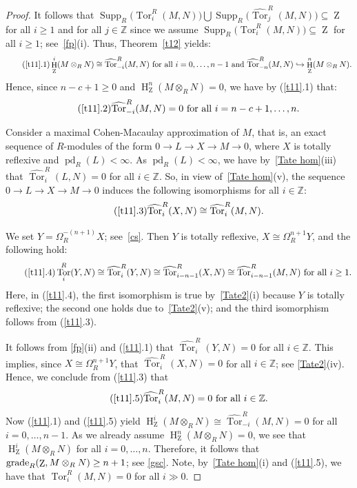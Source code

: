 \documentclass[11pt]{amsart}
\theoremstyle{definition}
\theoremstyle{definition}
\numberwithin{equation}{section}
\newcommand{\ZZ}{\mathbb{Z}}
\DeclareMathOperator{\gr}{\textnormal{grade}}
\DeclareMathOperator{\mz}{Z}
\DeclareMathOperator{\hh}{H}
\DeclareMathOperator{\pd}{pd}
\DeclareMathOperator{\Supp}{Supp}
\DeclareMathOperator{\Tor}{Tor}
\begin{document}
\begin{proof} It follows that $\Supp_R\big(\Tor_i^R(M,N)\big) \bigcup \Supp_R\Big(\widehat{\Tor}_j^R(M,N)\Big) \subseteq\mz$ for all $i\geq 1$ and for all $j\in\ZZ$ since we assume $\Supp_R\big(\Tor_{i}^R(M,N)\big)\subseteq\mz$ for all $i\geq 1$; see~\ref{fp}(i). Thus, Theorem~\ref{t12} yields:
\begin{equation}\tag{\ref{t11}.1}
\hh^i_{\mz}(M\otimes_RN)\cong\widehat{\Tor}_{-i}^R(M,N) \text{ for all } i=0, \ldots, n-1 \text{ and } \widehat{\Tor}_{-n}^R(M,N)\hookrightarrow\hh^n_{\mz}(M\otimes_RN).
\end{equation}
Hence, since $n-c+1 \geq 0$ and $\hh^n_{\mz}(M\otimes_RN)=0$, we have by (\ref{t11}.1) that:
\begin{equation}\tag{\ref{t11}.2}
\widehat{\Tor}_{-i}^R(M,N)=0 \text{ for all } i=n-c+1, \ldots, n.
\end{equation}

Consider a maximal Cohen-Macaulay approximation of $M$, that is, an exact sequence of $R$-modules of the form $0\to L\to X\to M\to0$, where $X$ is totally reflexive and $\pd_R(L)<\infty$. As $\pd_R(L)<\infty$, we have by~\ref{Tate hom}(iii) that $\widehat{\Tor}_i^R(L,N)=0$ for all $i\in\ZZ$. So, in view of~\ref{Tate hom}(v), the sequence $0\to L\to X\to M \to 0$ induces the following isomorphisms for all $i \in \ZZ$:
\begin{equation}\tag{\ref{t11}.3}
\widehat{\Tor}_i^R(X,N) \cong \widehat{\Tor}_i^R(M,N).
\end{equation}

We set $Y=\Omega_R^{-(n+1)}X$; see~\ref{cs}. Then $Y$ is totally reflexive, $X \cong \Omega_R^{n+1}Y$, and the following hold:
\begin{equation}\tag{\ref{t11}.4}
\Tor_i^R(Y,N)\cong\widehat{\Tor}_i^R(Y,N)\cong\widehat{\Tor}_{i-n-1}^R(X,N)\cong\widehat{\Tor}_{i-n-1}^R(M,N) \text{ for all } i\geq 1.
\end{equation}
Here, in (\ref{t11}.4), the first isomorphism is true by~\ref{Tate2}(i) because $Y$ is totally reflexive; the second one holds due to~\ref{Tate2}(v); and the third isomorphism follows from (\ref{t11}.3).

It follows from \ref{fp}(ii) and (\ref{t11}.1) that $\widehat{\Tor}_i^R(Y,N)=0$ for all $i\in\ZZ$. This implies, since $X \cong \Omega_R^{n+1}Y$, that $\widehat{\Tor}_i^R(X,N)=0$ for all $i\in\ZZ$; see \ref{Tate2}(iv). Hence, we conclude from (\ref{t11}.3) that 
\begin{equation}\tag{\ref{t11}.5}
\widehat{\Tor}_i^R(M,N)=0 \text{ for all } i\in \ZZ.
\end{equation}
Now (\ref{t11}.1)  and (\ref{t11}.5) yield $\hh^i_{\mz}(M\otimes_RN)\cong\widehat{\Tor}_{-i}^R(M,N)=0$ for all $i=0, \ldots, n-1$. As we already assume $\hh^n_{\mz}(M\otimes_RN)=0$, we see that $\hh^i_{\mz}(M\otimes_RN)$ for all $i=0, \ldots, n$. Therefore, it follows that $\gr_R(\mz,M\otimes_RN)\geq n+1$; see \ref{gsc}. Note, by~\ref{Tate hom}(i) and (\ref{t11}.5), we have that $\Tor_{i}^R(M,N)=0$ for all $i\gg0$.  


\end{proof}
\end{document}
